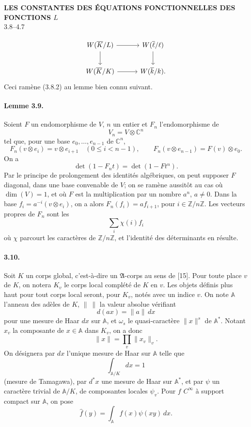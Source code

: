 \documentclass[10pt]{article}
\newcommand{\C}{\mathbb C}
\newcommand{\Z}{\mathbb Z}
\begin{document}
\begin{center}
{\Large\bfseries LES CONSTANTES DES ÉQUATIONS FONCTIONNELLES DES FONCTIONS \(L\)}\\[0.4em]
{\normalsize 3.8--4.7}
\end{center}


\[
\begin{tikzcd}[column sep=3.0em,row sep=2.0em]
W(\overline K/L)\arrow[r]\arrow[d]&W(\overline\ell/\ell)\arrow[d]\\
W(\overline K/K)\arrow[r]&W(\overline k/k).
\end{tikzcd}
\]
Ceci ramène (3.8.2) au lemme bien connu suivant.

\paragraph{Lemme 3.9.} Soient \(F\) un endomorphisme de \(V\), \(n\) un entier et \(F_n\) l'endomorphisme de
\[
V_n=V\otimes \C^n
\]
tel que, pour une base \(e_0,\ldots,e_{n-1}\) de \(\C^n\),
\[
F_n(v\otimes e_i)=v\otimes e_{i+1}\quad(0\le i<n-1),
\qquad
F_n(v\otimes e_{n-1})=F(v)\otimes e_0.
\]
On a
\[
\det(1-F_nt)=\det(1-Ft^n).
\]
Par le principe de prolongement des identités algébriques, on peut supposer \(F\) diagonal, dans une base convenable de \(V\); on se ramène aussitôt au cas où \(\dim(V)=1\), et où \(F\) est la multiplication par un nombre \(a^n\), \(a\ne0\). Dans la base \(f_i=a^{-i}(v\otimes e_i)\), on a alors \(F_n(f_i)=af_{i+1}\), pour \(i\in\Z/n\Z\). Les vecteurs propres de \(F_n\) sont les
\[
\sum_i \chi(i)f_i
\]
où \(\chi\) parcourt les caractères de \(\Z/n\Z\), et l'identité des déterminants en résulte.

\paragraph{3.10.} Soit \(K\) un corps global, c'est-à-dire un \(\mathfrak A\)-corps au sens de [15]. Pour toute place \(v\) de \(K\), on notera \(K_v\) le corps local complété de \(K\) en \(v\). Les objets définis plus haut pour tout corps local seront, pour \(K_v\), notés avec un indice \(v\). On note \(\mathbb A\) l'anneau des adèles de \(K\), \(\|\ \|\) la valeur absolue vérifiant
\[
d(ax)=\|a\|\,dx
\]
pour une mesure de Haar \(dx\) sur \(\mathbb A\), et \(\omega_s\) le quasi-caractère \(\|x\|^s\) de \(\mathbb A^*\). Notant \(x_v\) la composante de \(x\in\mathbb A\) dans \(K_v\), on a donc
\[
\|x\|=\prod_v\|x_v\|_v.
\]
On désignera par \(dx\) l'unique mesure de Haar sur \(\mathbb A\) telle que
\[
\int_{\mathbb A/K}dx=1
\]
(mesure de Tamagawa), par \(d^*x\) une mesure de Haar sur \(\mathbb A^*\), et par \(\psi\) un caractère trivial de \(\mathbb A/K\), de composantes locales \(\psi_v\). Pour \(f\) \(C^\infty\) à support compact sur \(\mathbb A\), on pose
\[
\widehat f(y)=\int_{\mathbb A}f(x)\psi(xy)\,dx.
\]
\end{document}
